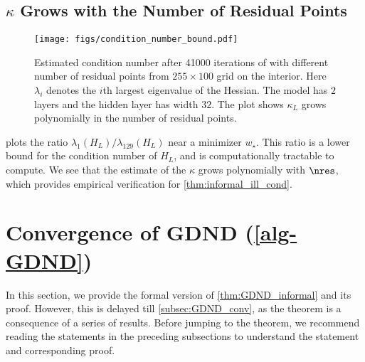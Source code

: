 \subsection{$\kappa$ Grows with the Number of Residual Points}
\label{subsec:kappa_grows}
\begin{figure*}
    \centering
    \texttt{[image: figs/condition\_number\_bound.pdf]}
    \caption{Estimated condition number after 41000 iterations of \al{} with different number of residual points from $255 \times 100$ grid on the interior. Here $\lambda_i$ denotes the $i$th largest eigenvalue of the Hessian. The model has $2$ layers and the hidden layer has width $32$. The plot shows $\kappa_L$ grows polynomially in the number of residual points.}
    \label{fig:condition_number_bound}
\end{figure*}
 plots the ratio $\lambda_1(H_L)/\lambda_{129}(H_L)$ near a minimizer $w_\star$. This ratio is a lower bound for the condition number of $H_L$, and is computationally tractable to compute. 
We see that the estimate of the $\kappa$ grows polynomially with $\nres$, which provides empirical verification for \cref{thm:informal_ill_cond}.


\section{Convergence of GDND (\cref{alg-GDND})}
\label{section:GDND_conv}
In this section, we provide the formal version of \cref{thm:GDND_informal} and its proof. 
However, this is delayed till \cref{subsec:GDND_conv}, as the theorem is a consequence of a series of results.
Before jumping to the theorem, we recommend reading the statements in the preceding subsections to understand the statement and corresponding proof. 
